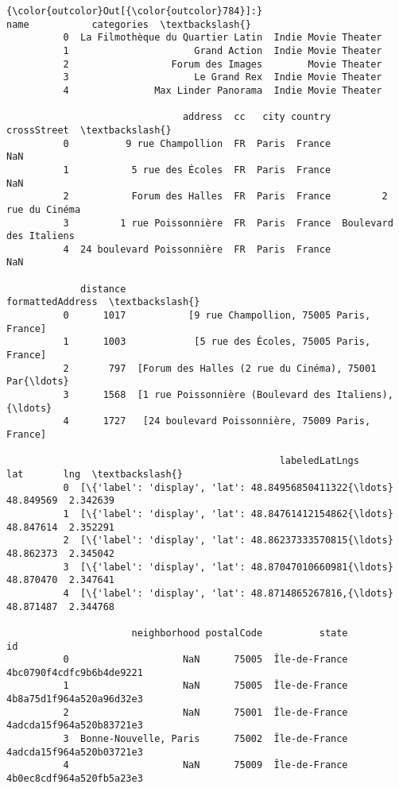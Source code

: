 \documentclass[11pt]{article}
\begin{document}
\begin{Verbatim}[commandchars=\\\{\}]
{\color{outcolor}Out[{\color{outcolor}784}]:}                                name           categories  \textbackslash{}
          0  La Filmothèque du Quartier Latin  Indie Movie Theater   
          1                      Grand Action  Indie Movie Theater   
          2                  Forum des Images        Movie Theater   
          3                      Le Grand Rex  Indie Movie Theater   
          4               Max Linder Panorama  Indie Movie Theater   
          
                               address  cc   city country             crossStreet  \textbackslash{}
          0          9 rue Champollion  FR  Paris  France                     NaN   
          1           5 rue des Écoles  FR  Paris  France                     NaN   
          2           Forum des Halles  FR  Paris  France         2 rue du Cinéma   
          3         1 rue Poissonnière  FR  Paris  France  Boulevard des Italiens   
          4  24 boulevard Poissonnière  FR  Paris  France                     NaN   
          
             distance                                   formattedAddress  \textbackslash{}
          0      1017           [9 rue Champollion, 75005 Paris, France]   
          1      1003            [5 rue des Écoles, 75005 Paris, France]   
          2       797  [Forum des Halles (2 rue du Cinéma), 75001 Par{\ldots}   
          3      1568  [1 rue Poissonnière (Boulevard des Italiens), {\ldots}   
          4      1727   [24 boulevard Poissonnière, 75009 Paris, France]   
          
                                                labeledLatLngs        lat       lng  \textbackslash{}
          0  [\{'label': 'display', 'lat': 48.84956850411322{\ldots}  48.849569  2.342639   
          1  [\{'label': 'display', 'lat': 48.84761412154862{\ldots}  48.847614  2.352291   
          2  [\{'label': 'display', 'lat': 48.86237333570815{\ldots}  48.862373  2.345042   
          3  [\{'label': 'display', 'lat': 48.87047010660981{\ldots}  48.870470  2.347641   
          4  [\{'label': 'display', 'lat': 48.8714865267816,{\ldots}  48.871487  2.344768   
          
                      neighborhood postalCode          state                        id  
          0                    NaN      75005  Île-de-France  4bc0790f4cdfc9b6b4de9221  
          1                    NaN      75005  Île-de-France  4b8a75d1f964a520a96d32e3  
          2                    NaN      75001  Île-de-France  4adcda15f964a520b83721e3  
          3  Bonne-Nouvelle, Paris      75002  Île-de-France  4adcda15f964a520b03721e3  
          4                    NaN      75009  Île-de-France  4b0ec8cdf964a520fb5a23e3  
\end{Verbatim}
            
\end{document}
